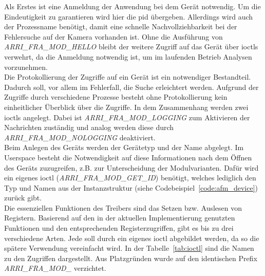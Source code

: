 Als Erstes ist eine Anmeldung der Anwendung bei dem Gerät notwendig. Um die Eindeutigkeit zu garantieren wird hier die \ac{pid} übergeben. Allerdings wird auch der Prozessname benötigt, damit eine schnelle Nachvollziehbarkeit bei der Fehlersuche auf der Kamera vorhanden ist.
Ohne die Ausführung von \mbox{\textit{ARRI\_FRA\_MOD\_HELLO}} bleibt der weitere Zugriff auf das Gerät über \ac{ioctl}s verwehrt, da die Anmeldung notwendig ist, um im laufenden Betrieb Analysen vorzunehmen.\\

Die Protokollierung der Zugriffe auf ein Gerät ist ein notwendiger Bestandteil. Dadurch soll, vor allem im Fehlerfall, die Suche erleichtert werden. Aufgrund der Zugriffe durch verschiedene Prozesse besteht ohne Protokollierung kein einheitlicher Überblick über die Zugriffe.
In dem Zusammenhang werden zwei \ac{ioctl}s angelegt. Dabei ist \mbox{\textit{ARRI\_FRA\_MOD\_LOGGING}} zum Aktivieren der Nachrichten zuständig und analog werden diese durch \mbox{\textit{ARRI\_FRA\_MOD\_NOLOGGING}} deaktiviert. \\

Beim Anlegen des Geräts werden der Gerätetyp und der Name abgelegt. Im Userspace besteht die Notwendigkeit auf diese Informationen nach dem Öffnen des Geräts zuzugreifen, z.B. zur Unterscheidung der Modulvarianten. Dafür wird ein eigenes \ac{ioctl} (\mbox{\textit{ARRI\_FRA\_MOD\_GET\_ID}}) benötigt, welches lediglich den Typ und Namen aus der Instanzstruktur (siehe Codebeispiel~\ref{code:afm_device}) zurück gibt.\\

Die essenziellen Funktionen des Treibers sind das Setzen bzw. Auslesen von Registern. Basierend auf den in der aktuellen Implementierung genutzten Funktionen und den entsprechenden Registerzugriffen, gibt es bis zu drei verschiedene Arten. Jede soll durch ein eigenes \ac{ioctl} abgebildet werden, da so die spätere Verwendung vereinfacht wird.  In der Tabelle~\ref{tab:ioctl} sind die Namen zu den Zugriffen dargestellt. Aus Platzgründen wurde auf den identischen Prefix \mbox{\textit{ARRI\_FRA\_MOD\_}} verzichtet.



